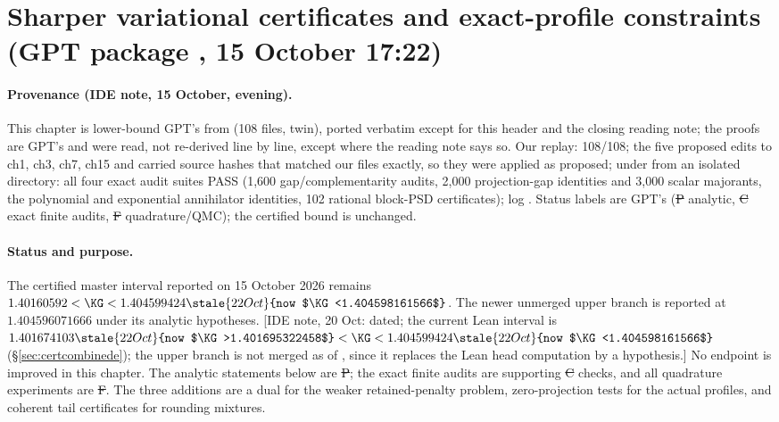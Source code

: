 \section{Sharper variational certificates and exact-profile constraints (GPT package , 15 October 17:22)}
\label{ch:crossbound}

\paragraph{Provenance (IDE note, 15 October, evening).} This chapter is lower-bound GPT's  from
 (108 files,  twin), ported verbatim except for this header and the closing reading note;
the proofs are GPT's and were read, not re-derived line by line, except where the reading note says so. Our replay:  108/108; the five proposed edits to
ch1, ch3, ch7, ch15 and  carried source hashes that matched our files exactly, so they were applied as proposed;  under  from an
isolated directory: all four exact audit suites PASS (1,600 gap/complementarity audits, 2,000 projection-gap identities and 3,000 scalar majorants, the polynomial and exponential
annihilator identities, 102 rational block-PSD certificates); log . Status labels are GPT's (\st{P} analytic, \st{C} exact finite
audits, \st{F} quadrature/QMC); the certified bound is unchanged.

\paragraph{Status and purpose.}
The certified master interval reported on 15 October 2026 remains
$1.40160592<\KG<1.404599424\stale{22 Oct}{now $\KG<1.404598161566$}$. The newer unmerged upper branch is reported
at $1.404596071666$ under its analytic hypotheses. [IDE note, 20 Oct: dated; the current Lean interval is $1.401674103\stale{22 Oct}{now $\KG>1.401695322458$}<\KG<1.404599424\stale{22 Oct}{now $\KG<1.404598161566$}$ (\S\ref{sec:certcombinede}); the upper branch  is not merged as of , since it replaces the Lean head computation by a  hypothesis.] No endpoint is improved
in this chapter. The analytic statements below are \st{P}; the exact finite
audits are supporting \st{C} checks, and all quadrature experiments are
\st{F}. The three additions are a dual for the weaker retained-penalty
problem, zero-projection tests for the actual profiles, and coherent tail
certificates for rounding mixtures.

